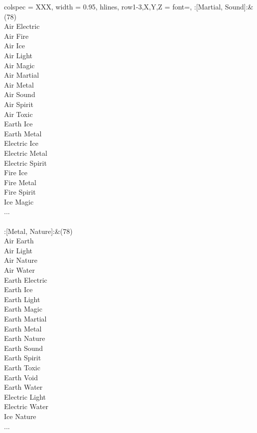 \begin{longtblr}[
	caption = {2v2 Attacking Effective},
	label = {2v2-Attacking-Effective},
]{
	colspec = {XXX}, width = 0.95\linewidth,
	hlines,
	row{1-3,X,Y,Z} = {font=\bfseries},
}
	:[Martial, Sound]:&{(78)\\
	Air Electric \\
	Air Fire \\
	Air Ice \\
	Air Light \\
	Air Magic \\
	Air Martial \\
	Air Metal \\
	Air Sound \\
	Air Spirit \\
	Air Toxic \\
	Earth Ice \\
	Earth Metal \\
	Electric Ice \\
	Electric Metal \\
	Electric Spirit \\
	Fire Ice \\
	Fire Metal \\
	Fire Spirit \\
	Ice Magic \\
	...\\
	}\\

	:[Metal, Nature]:&{(78)\\
	Air Earth \\
	Air Light \\
	Air Nature \\
	Air Water \\
	Earth Electric \\
	Earth Ice \\
	Earth Light \\
	Earth Magic \\
	Earth Martial \\
	Earth Metal \\
	Earth Nature \\
	Earth Sound \\
	Earth Spirit \\
	Earth Toxic \\
	Earth Void \\
	Earth Water \\
	Electric Light \\
	Electric Water \\
	Ice Nature \\
	...\\
	}\\


\end{longtblr}
